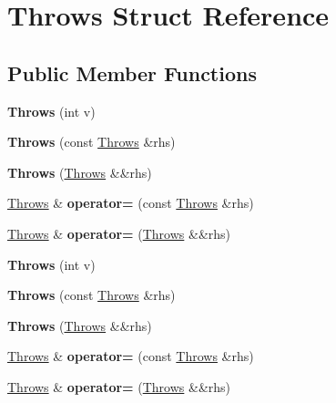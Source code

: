 \hypertarget{struct_throws}{}\section{Throws Struct Reference}
\label{struct_throws}
\subsection*{Public Member Functions}
\begin{DoxyCompactItemize}
\item 
\mbox{\label{struct_throws_a878738308ac84c65c964f7e58f48be97}} 
{\bfseries Throws} (int v)
\item 
\mbox{\label{struct_throws_a4b6b6890d1e76b277dbca0416ea137c2}} 
{\bfseries Throws} (const \mbox{\hyperlink{struct_throws}{Throws}} \&rhs)
\item 
\mbox{\label{struct_throws_ac9992a2df11ee816cde16481d09accf6}} 
{\bfseries Throws} (\mbox{\hyperlink{struct_throws}{Throws}} \&\&rhs)
\item 
\mbox{\label{struct_throws_a6a0142ed9baf4d36292fafe1faa70101}} 
\mbox{\hyperlink{struct_throws}{Throws}} \& {\bfseries operator=} (const \mbox{\hyperlink{struct_throws}{Throws}} \&rhs)
\item 
\mbox{\label{struct_throws_a6d1d4d18cbdaab993e9a7fcef008d851}} 
\mbox{\hyperlink{struct_throws}{Throws}} \& {\bfseries operator=} (\mbox{\hyperlink{struct_throws}{Throws}} \&\&rhs)
\item 
\mbox{\label{struct_throws_a878738308ac84c65c964f7e58f48be97}} 
{\bfseries Throws} (int v)
\item 
\mbox{\label{struct_throws_a4b6b6890d1e76b277dbca0416ea137c2}} 
{\bfseries Throws} (const \mbox{\hyperlink{struct_throws}{Throws}} \&rhs)
\item 
\mbox{\label{struct_throws_ac9992a2df11ee816cde16481d09accf6}} 
{\bfseries Throws} (\mbox{\hyperlink{struct_throws}{Throws}} \&\&rhs)
\item 
\mbox{\label{struct_throws_a6a0142ed9baf4d36292fafe1faa70101}} 
\mbox{\hyperlink{struct_throws}{Throws}} \& {\bfseries operator=} (const \mbox{\hyperlink{struct_throws}{Throws}} \&rhs)
\item 
\mbox{\label{struct_throws_a6d1d4d18cbdaab993e9a7fcef008d851}} 
\mbox{\hyperlink{struct_throws}{Throws}} \& {\bfseries operator=} (\mbox{\hyperlink{struct_throws}{Throws}} \&\&rhs)
\end{DoxyCompactItemize}
